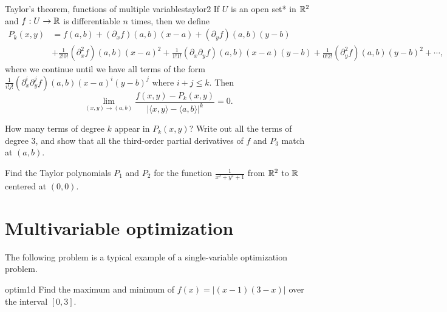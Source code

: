 \documentclass{watsonbook}
\begin{document}
\begin{theo}{Taylor's theorem, functions of multiple variables}{taylor2}
  If $U$ is an open set* in $\mathbb{R}^2$ and $f: U \to \mathbb{R}$ is differentiable
  $n$ times, then we define 
  \begin{align*}
    P_k(x,y) &= f(a,b) + (\partial_x f)(a,b)(x-a) +
               (\partial_y f)(a,b)(y-b) \\ &+ \frac{1}{2!0!}(\partial_x^2 f)(a,b)(x-a)^2 +
                                             \frac{1}{1!1!}(\partial_x\partial_y f)(a,b)(x-a)(y-b) +  \frac{1}{0!2!}(\partial_y^2
                                             f)(a,b)(y-b)^2 + \cdots, 
  \end{align*}
  where we continue until we have all terms of the form
  $\frac{1}{i!j!}(\partial_x^i\partial_y^j f)(a,b)(x-a)^i(y-b)^j$ where
  $i+j \leq k$. Then
  \[
    \lim_{(x,y) \to (a,b)}\frac{f(x,y) -
      P_k(x,y)}{|\langle x, y \rangle - \langle a,b \rangle|^k} =
    0. 
  \]
\end{theo}

\begin{exercise}{}{}
  How many terms of degree $k$ appear in $P_k(x,y)$? Write out all the
  terms of degree 3, and show that all the third-order partial
  derivatives of $f$ and $P_3$ match at $(a,b)$.
\end{exercise}

\begin{exercise}{}{}
  Find the Taylor polynomials $P_1$ and $P_2$ for the function
  $\frac{1}{x^2 + y^2 + 1}$ from $\mathbb{R}^2$ to $\mathbb{R}$ centered at $(0,0)$.
\end{exercise}

\section{Multivariable optimization} \label{sec:optim} 


The following problem is a typical example of a single-variable
optimization problem.

\begin{example}{}{optim1d}
  Find the maximum and minimum of $f(x) = |(x - 1)(3-x)|$ over the interval
  $[0,3]$. 
\end{example}
\end{document}
